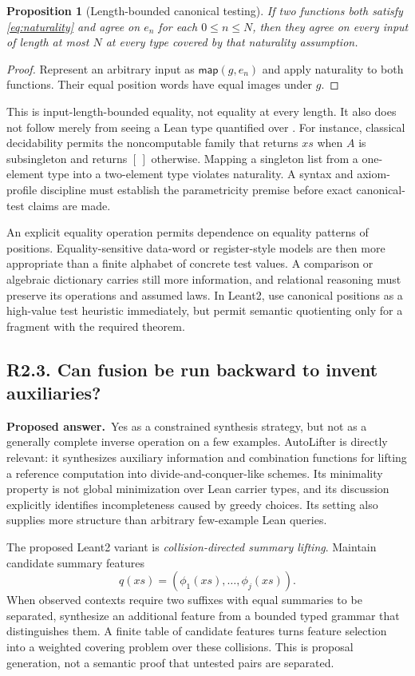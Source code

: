 \documentclass[11pt,a4paper]{article}
\newcommand{\code}[1]{\texttt{\small\detokenize{#1}}}
\newcommand{\nil}{[\,]}
\newcommand{\question}[2]{\subsection{#1. #2}\label{q:#1}}
\newcommand{\answer}{\textbf{Proposed answer.}\ }
\newtheorem{proposition}{Proposition}[section]
\theoremstyle{remark}
\begin{document}
\begin{proposition}[Length-bounded canonical testing]
If two functions both satisfy \eqref{eq:naturality} and agree on $e_n$ for
each $0\leq n\leq N$, then they agree on every input of length at most $N$ at
every type covered by that naturality assumption.
\end{proposition}
\begin{proof}
Represent an arbitrary input as $\mathsf{map}(g,e_n)$ and apply naturality to
both functions. Their equal position words have equal images under $g$.
\end{proof}

This is input-length-bounded equality, not equality at every length. It also
does not follow merely from seeing a Lean type quantified over \code{Type}.
For instance, classical decidability permits the noncomputable family that
returns $xs$ when $A$ is subsingleton and returns $\nil$ otherwise. Mapping a
singleton list from a one-element type into a two-element type violates
naturality. A syntax and axiom-profile discipline must establish the
parametricity premise before exact canonical-test claims are made.

An explicit equality operation permits dependence on equality patterns of
positions. Equality-sensitive data-word or register-style models are then
more appropriate than a finite alphabet of concrete test values. A comparison
or algebraic dictionary carries still more information, and relational
reasoning must preserve its operations and assumed laws. In Leant2, use
canonical positions as a high-value test heuristic immediately, but permit
semantic quotienting only for a fragment with the required theorem.

\question{R2.3}{Can fusion be run backward to invent auxiliaries?}

\answer Yes as a constrained synthesis strategy, but not as a generally
complete inverse operation on a few examples. AutoLifter is directly relevant:
it synthesizes auxiliary information and combination functions for
lifting a reference computation into divide-and-conquer-like schemes. Its
minimality property is not global minimization over Lean carrier types, and
its discussion explicitly identifies incompleteness caused by greedy
choices. Its setting also supplies more structure than arbitrary few-example
Lean queries.\cite{autolifter}

The proposed Leant2 variant is \emph{collision-directed summary lifting}.
Maintain candidate summary features
\[
 q(xs)=(\phi_1(xs),\ldots,\phi_j(xs)).
\]
When observed contexts require two suffixes with equal summaries to be
separated, synthesize an additional feature from a bounded typed grammar
that distinguishes them. A finite table of candidate features turns feature
selection into a weighted covering problem over these collisions. This is
proposal generation, not a semantic proof that untested pairs are separated.
\end{document}
